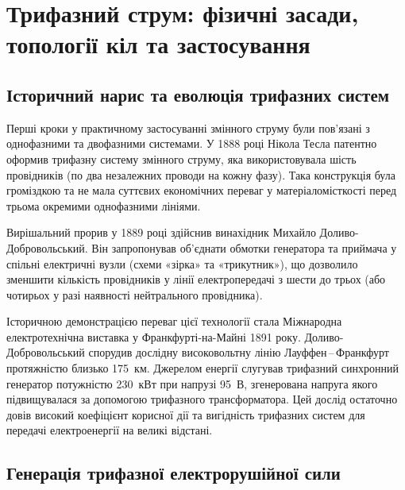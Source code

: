 \documentclass[]{ConspectBook}
\begin{document}
\section{Трифазний струм: фізичні засади, топології кіл та застосування}

\subsection*{Історичний нарис та еволюція трифазних систем}

Перші кроки у практичному застосуванні змінного струму були пов'язані з однофазними та двофазними системами. У 1888 році Нікола Тесла патентно оформив трифазну систему змінного струму, яка використовувала шість провідників (по два незалежних проводи на кожну фазу). Така конструкція була громіздкою та не мала суттєвих економічних переваг у матеріаломісткості перед трьома окремими однофазними лініями.

Вирішальний прорив у 1889 році здійснив винахідник Михайло Доливо-Добровольський. Він запропонував об'єднати обмотки генератора та приймача у спільні електричні вузли (схеми «зірка» та «трикутник»), що дозволило зменшити кількість провідників у лінії електропередачі з шести до трьох (або чотирьох у разі наявності нейтрального провідника).

Історичною демонстрацією переваг цієї технології стала Міжнародна електротехнічна виставка у Франкфурті-на-Майні 1891 року. Доливо-Добровольський спорудив дослідну високовольтну лінію Лауффен\,--\,Франкфурт протяжністю близько 175~км. Джерелом енергії слугував трифазний синхронний генератор потужністю 230~кВт при напрузі 95~В, згенерована напруга якого підвищувалася за допомогою трифазного трансформатора. Цей дослід остаточно довів високий коефіцієнт корисної дії та вигідність трифазних систем для передачі електроенергії на великі відстані.

\subsection*{Генерація трифазної електрорушійної сили}
\end{document}
